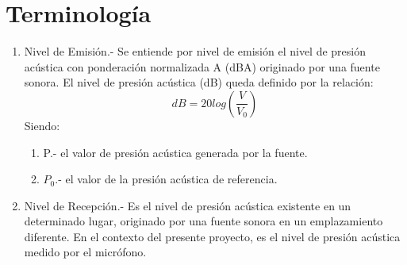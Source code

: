 \chapter{Terminología} \label{append:terminologia}

\begin{enumerate}
	\item Nivel de Emisión.- Se entiende por nivel de emisión el nivel de presión acústica con ponderación	normalizada A (dBA) originado por una fuente sonora.
	\subitem El nivel de presión acústica (dB) queda definido por la relación: \\
	\begin{equation}
		\label{form:dbs}
		dB = 20log\left ( \frac{V}{V_{0}} \right )
	\end{equation}
	\subitem Siendo:
	\begin{enumerate}
		\item P.- el valor de presión acústica generada por la fuente.
		\item \(P_{0}\).- el valor de la presión acústica de referencia.
	\end{enumerate}

	\item Nivel de Recepción.- Es el nivel de presión acústica existente en un determinado lugar, originado por una fuente sonora en un emplazamiento diferente. En el contexto del presente proyecto, es el nivel de presión acústica medido por el micrófono.

\end{enumerate}
